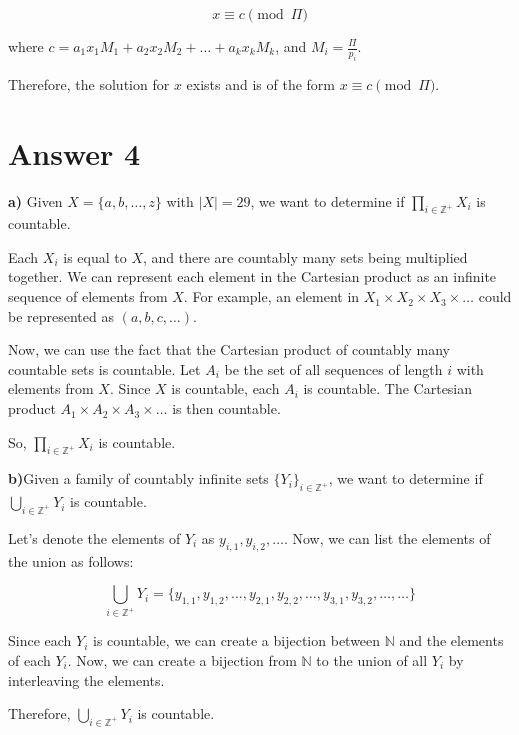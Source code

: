 \documentclass[12pt]{article}
\begin{document}
\[ x \equiv c \pmod{\Pi} \]

where \(c = a_1x_1M_1 + a_2x_2M_2 + \ldots + a_kx_kM_k\), and \(M_i = \frac{\Pi}{p_i}\).

Therefore, the solution for \(x\) exists and is of the form \(x \equiv c \pmod{\Pi}\).


\section*{Answer 4}
\textbf{a)}
Given \( X = \{a, b, \ldots, z\} \) with \( |X| = 29 \), we want to determine if \( \prod_{i \in \mathbb{Z}^+} X_i \) is countable.

Each \( X_i \) is equal to \( X \), and there are countably many sets being multiplied together. We can represent each element in the Cartesian product as an infinite sequence of elements from \( X \). For example, an element in \( X_1 \times X_2 \times X_3 \times \ldots \) could be represented as \( (a, b, c, \ldots) \).

Now, we can use the fact that the Cartesian product of countably many countable sets is countable. Let \( A_i \) be the set of all sequences of length \( i \) with elements from \( X \). Since \( X \) is countable, each \( A_i \) is countable. The Cartesian product \( A_1 \times A_2 \times A_3 \times \ldots \) is then countable.

So, \( \prod_{i \in \mathbb{Z}^+} X_i \) is countable.


\textbf{b)}Given a family of countably infinite sets \( \{Y_i\}_{i \in \mathbb{Z}^+} \), we want to determine if \( \bigcup_{i \in \mathbb{Z}^+} Y_i \) is countable.

Let's denote the elements of \( Y_i \) as \( y_{i,1}, y_{i,2}, \ldots \). Now, we can list the elements of the union as follows:

\[ \bigcup_{i \in \mathbb{Z}^+} Y_i = \{ y_{1,1}, y_{1,2}, \ldots, y_{2,1}, y_{2,2}, \ldots, y_{3,1}, y_{3,2}, \ldots, \ldots \} \]

Since each \( Y_i \) is countable, we can create a bijection between \( \mathbb{N} \) and the elements of each \( Y_i \). Now, we can create a bijection from \( \mathbb{N} \) to the union of all \( Y_i \) by interleaving the elements.

Therefore, \( \bigcup_{i \in \mathbb{Z}^+} Y_i \) is countable.
\end{document}
